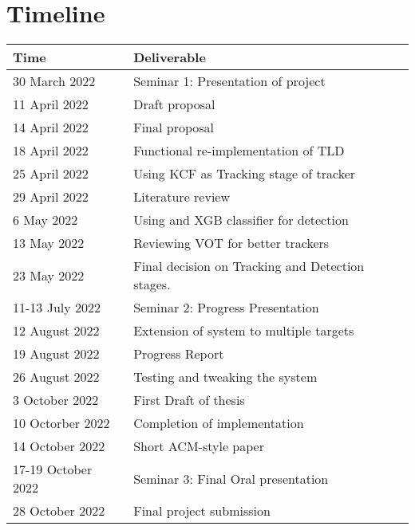 \section{Timeline}
\begin{center}
  \begin{tabular}{l l}
    \toprule
      Time & Deliverable\\
    \midrule
      30 March 2022     & Seminar 1: Presentation of project\\
      11 April 2022     & Draft proposal\\
      14 April 2022     & Final proposal\\
      18 April 2022     & Functional re-implementation of TLD\\
      25 April 2022     & Using KCF as Tracking stage of tracker\\
      29 April 2022     & Literature review\\
      6 May 2022        & Using and XGB classifier for detection\\
      13 May 2022       & Reviewing VOT for better trackers\\
      23 May 2022       & Final decision on Tracking and Detection stages.\\
      11-13 July 2022   & Seminar 2: Progress Presentation\\
      12 August 2022    & Extension of system to multiple targets\\
      19 August 2022    & Progress Report\\
      26 August 2022    & Testing and tweaking the system\\
      3 October 2022    & First Draft of thesis\\
      10 Octorber 2022  & Completion of implementation\\
      14 October 2022   & Short ACM-style paper\\
      17-19 October 2022& Seminar 3: Final Oral presentation\\
      28 October 2022   & Final project submission\\
    \bottomrule
  \end{tabular}
\end{center}
